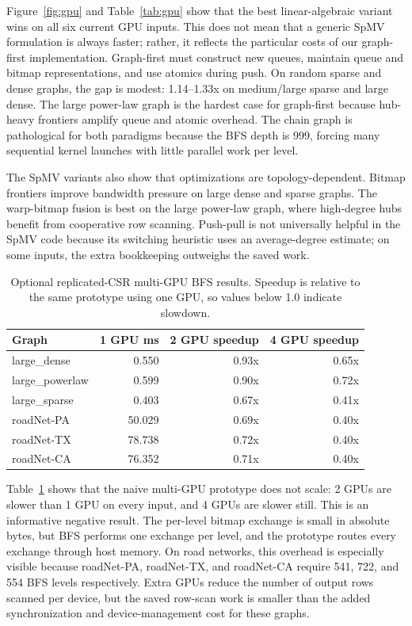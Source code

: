 \documentclass[11pt]{article}
\begin{document}
Figure~\ref{fig:gpu} and Table~\ref{tab:gpu} show that the best
linear-algebraic variant wins on all six current GPU inputs. This does not mean
that a generic SpMV formulation is always faster; rather, it reflects the
particular costs of our graph-first implementation. Graph-first must construct
new queues, maintain queue and bitmap representations, and use atomics during
push. On random sparse and dense graphs, the gap is modest: 1.14--1.33x on
medium/large sparse and large dense. The large power-law graph is the hardest
case for graph-first because hub-heavy frontiers amplify queue and atomic
overhead. The chain graph is pathological for both paradigms because the BFS
depth is 999, forcing many sequential kernel launches with little parallel work
per level.

The SpMV variants also show that optimizations are topology-dependent. Bitmap
frontiers improve bandwidth pressure on large dense and sparse graphs. The
warp-bitmap fusion is best on the large power-law graph, where high-degree hubs
benefit from cooperative row scanning. Push-pull is not universally helpful in
the SpMV code because its switching heuristic uses an average-degree estimate;
on some inputs, the extra bookkeeping outweighs the saved work.

\begin{table}[t]
\centering
\caption{Optional replicated-CSR multi-GPU BFS results. Speedup is relative to
the same prototype using one GPU, so values below 1.0 indicate slowdown.}
\label{tab:mgpu}
\small
\begin{tabular}{@{}l r r r@{}}
\toprule
Graph & 1 GPU ms & 2 GPU speedup & 4 GPU speedup \\
\midrule
large\_dense & 0.550 & 0.93x & 0.65x \\
large\_powerlaw & 0.599 & 0.90x & 0.72x \\
large\_sparse & 0.403 & 0.67x & 0.41x \\
roadNet-PA & 50.029 & 0.69x & 0.40x \\
roadNet-TX & 78.738 & 0.72x & 0.40x \\
roadNet-CA & 76.352 & 0.71x & 0.40x \\
\bottomrule
\end{tabular}
\end{table}

Table~\ref{tab:mgpu} shows that the naive multi-GPU prototype does not scale:
2 GPUs are slower than 1 GPU on every input, and 4 GPUs are slower still. This
is an informative negative result. The per-level bitmap exchange is small in
absolute bytes, but BFS performs one exchange per level, and the prototype
routes every exchange through host memory. On road networks, this overhead is
especially visible because roadNet-PA, roadNet-TX, and roadNet-CA require 541,
722, and 554 BFS levels respectively. Extra GPUs reduce the number of output
rows scanned per device, but the saved row-scan work is smaller than the added
synchronization and device-management cost for these graphs.
\end{document}
